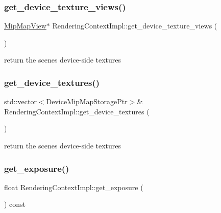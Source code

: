 \subsubsection{\texorpdfstring{get\+\_\+device\+\_\+texture\+\_\+views()}{get\_device\_texture\_views()}}
{\footnotesize\ttfamily \hyperlink{struct_mip_map_view}{Mip\+Map\+View}$\ast$ Rendering\+Context\+Impl\+::get\+\_\+device\+\_\+texture\+\_\+views (\begin{DoxyParamCaption}{ }\end{DoxyParamCaption})\hspace{0.3cm}{\ttfamily [inline]}}

return the scene\textquotesingle{}s device-\/side textures \mbox{\label{struct_rendering_context_impl_ad467c9e4c5b65a58b141a0d7febd95c2}} 
\subsubsection{\texorpdfstring{get\+\_\+device\+\_\+textures()}{get\_device\_textures()}}
{\footnotesize\ttfamily std\+::vector$<$Device\+Mip\+Map\+Storage\+Ptr$>$\& Rendering\+Context\+Impl\+::get\+\_\+device\+\_\+textures (\begin{DoxyParamCaption}{ }\end{DoxyParamCaption})\hspace{0.3cm}{\ttfamily [inline]}}

return the scene\textquotesingle{}s device-\/side textures \mbox{\label{struct_rendering_context_impl_a0f6fa3a9316c81d4eb600d9a28a8c16f}} 
\subsubsection{\texorpdfstring{get\+\_\+exposure()}{get\_exposure()}}
{\footnotesize\ttfamily float Rendering\+Context\+Impl\+::get\+\_\+exposure (\begin{DoxyParamCaption}{ }\end{DoxyParamCaption}) const\hspace{0.3cm}{\ttfamily [inline]}}

